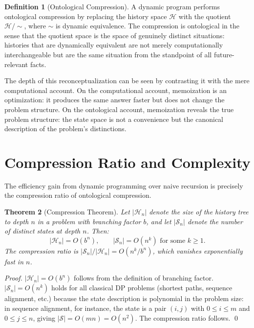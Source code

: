 \documentclass[12pt, a4paper, openany]{book}
\theoremstyle{plain}
\newtheorem{theorem}{Theorem}[chapter]
\theoremstyle{definition}
\newtheorem{definition}[theorem]{Definition}
\theoremstyle{remark}
\newcommand{\Hist}{\mathcal{H}}
\begin{document}
\begin{definition}[Ontological Compression]
A dynamic program performs ontological compression by replacing the history space $\Hist$ with the quotient $\Hist / {\sim}$, where $\sim$ is dynamic equivalence. The compression is ontological in the sense that the quotient space is the space of genuinely distinct situations: histories that are dynamically equivalent are not merely computationally interchangeable but are the same situation from the standpoint of all future-relevant facts.
\end{definition}

The depth of this reconceptualization can be seen by contrasting it with the mere computational account. On the computational account, memoization is an optimization: it produces the same answer faster but does not change the problem structure. On the ontological account, memoization reveals the true problem structure: the state space is not a convenience but the canonical description of the problem's distinctions.

\section{Compression Ratio and Complexity}

The efficiency gain from dynamic programming over naive recursion is precisely the compression ratio of ontological compression.

\begin{theorem}[Compression Theorem]
Let $|\Hist_n|$ denote the size of the history tree to depth $n$ in a problem with branching factor $b$, and let $|\mathcal{S}_n|$ denote the number of distinct states at depth $n$. Then:
\[
|\Hist_n| = O(b^n), \qquad |\mathcal{S}_n| = O(n^k) \text{ for some } k \geq 1.
\]
The compression ratio is $|\mathcal{S}_n| / |\Hist_n| = O(n^k / b^n)$, which vanishes exponentially fast in $n$.
\end{theorem}

\begin{proof}
$|\Hist_n| = O(b^n)$ follows from the definition of branching factor. $|\mathcal{S}_n| = O(n^k)$ holds for all classical DP problems (shortest paths, sequence alignment, etc.) because the state description is polynomial in the problem size: in sequence alignment, for instance, the state is a pair $(i,j)$ with $0 \leq i \leq m$ and $0 \leq j \leq n$, giving $|\mathcal{S}| = O(mn) = O(n^2)$. The compression ratio follows. \qed
\end{proof}
\end{document}
